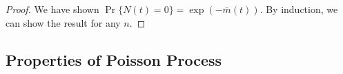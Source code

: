\documentclass[a4paper,10pt]{article}
\theoremstyle{plain}
\theoremstyle{definition}
\begin{document}
\begin{proof}
We have shown $\Pr\{N(t)=0\} = \exp(-\bar{m}(t))$. By induction, we can show the result for any $n$.
\end{proof}

\subsection{Properties of Poisson Process}
\end{document}
